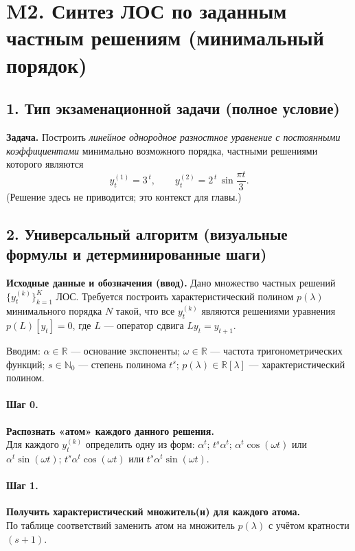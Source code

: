 \section{M2. Синтез ЛОС по заданным частным решениям (минимальный порядок)}

\subsection*{1. Тип экзаменационной задачи (полное условие)}
\textbf{Задача.} Построить \emph{линейное однородное разностное уравнение с постоянными коэффициентами} минимально возможного порядка, частными решениями которого являются
\[
y^{(1)}_{t}=3^{\,t},\qquad y^{(2)}_{t}=2^{\,t}\,\sin\!\frac{\pi t}{3}.
\]
(Решение здесь не приводится; это контекст для главы.)

\subsection*{2. Универсальный алгоритм (визуальные формулы и детерминированные шаги)}

\textbf{Исходные данные и обозначения (ввод).} Дано множество частных решений \(\{y^{(k)}_t\}_{k=1}^K\) ЛОС. Требуется построить характеристический полином \(p(\lambda)\) минимального порядка \(N\) такой, что все \(y^{(k)}_t\) являются решениями уравнения \(p(L)[y_t]=0\), где \(L\) — оператор сдвига \(Ly_t=y_{t+1}\).

Вводим: \(\alpha\in\mathbb{R}\) — основание экспоненты; \(\omega\in\mathbb{R}\) — частота тригонометрических функций; \(s\in\mathbb{N}_0\) — степень полинома \(t^s\); \(p(\lambda)\in\mathbb{R}[\lambda]\) — характеристический полином.

\paragraph{Шаг 0.} \textbf{Распознать «атом» каждого данного решения.}\\
Для каждого \(y^{(k)}_t\) определить одну из форм:
\(\alpha^t\); \(t^{s}\alpha^t\); \(\alpha^t\cos(\omega t)\) или \(\alpha^t\sin(\omega t)\); \(t^{s}\alpha^t\cos(\omega t)\) или \(t^{s}\alpha^t\sin(\omega t)\).

\paragraph{Шаг 1.} \textbf{Получить характеристический множитель(и) для каждого атома.}\\
По таблице соответствий заменить атом на множитель \(p(\lambda)\) с учётом кратности \((s+1)\).

